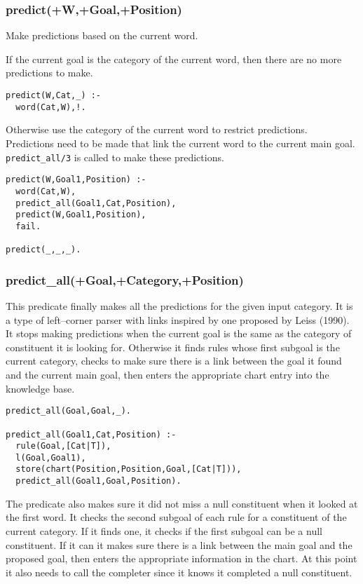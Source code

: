 \documentclass[12pt]{article}
\begin{document}
\subsubsection{predict(+W,+Goal,+Position)}
Make predictions based on the current word.

If the current goal is the category of the current word, then there are no more predictions to make.
\begin{verbatim}
predict(W,Cat,_) :-
  word(Cat,W),!.
\end{verbatim}
Otherwise use the category of the current word to restrict predictions.  Predictions need to be made that link the current word to the current main goal.\verb| predict_all/3| is called to make these predictions.
\begin{verbatim}
predict(W,Goal1,Position) :-
  word(Cat,W),
  predict_all(Goal1,Cat,Position),
  predict(W,Goal1,Position),
  fail.

predict(_,_,_).
\end{verbatim}

\subsubsection{predict\_all(+Goal,+Category,+Position)}
This predicate finally makes all the predictions for the given input category.  It is a type of left--corner parser with links inspired by one proposed by Leiss (1990). It stops making predictions when the current goal is the same as the category of constituent it is looking for.  Otherwise it finds rules whose first subgoal is the current category, checks to make sure there is a link between the goal it found and the current main goal, then enters the appropriate chart entry into the knowledge base.


\begin{verbatim}
predict_all(Goal,Goal,_).

predict_all(Goal1,Cat,Position) :-
  rule(Goal,[Cat|T]),
  l(Goal,Goal1),
  store(chart(Position,Position,Goal,[Cat|T])),
  predict_all(Goal1,Goal,Position).
\end{verbatim}

The predicate also makes sure it did not miss a null constituent when it looked at the first word.  It checks the second subgoal of each rule for a constituent of the current category.  If it finds one, it checks if the first subgoal can be a null constituent.  If it can it makes sure there is a link between the main goal and the proposed goal, then enters the appropriate information in the chart.  At this point it also needs to call the completer since it knows it completed a null constituent.
\end{document}
